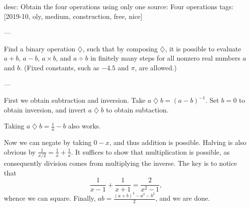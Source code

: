 desc: Obtain the four operations using only one
source: Four operations
tags: [2019-10, oly, medium, construction, free, nice]

---

Find a binary operation $\mathbin\diamondsuit$, such that by composing $\mathbin\diamondsuit$, it is possible to evaluate $a+b$, $a-b$, $a\times b$, and $a\div b$ in finitely many steps for all nonzero real numbers $a$ and $b$. (Fixed constants, such as $-4.5$ and $\pi$, are allowed.)

---

First we obtain subtraction and inversion. Take $a\mathbin\diamondsuit b=(a-b)^{-1}$. Set $b=0$ to obtain inversion, and invert $a\mathbin\diamondsuit b$ to obtain subtaction.
\begin{remark}
    Taking $a\mathbin\diamondsuit b=\frac1a-b$ also works.
\end{remark}
Now we can negate by taking $0-x$, and thus addition is possible. Halving is also obvious by $\frac1{x/2}=\frac1x+\frac1x$. It suffices to show that multiplication is possible, as consequently division comes from multiplying the inverse. The key is to notice that\[\frac1{x-1}+\frac1{x+1}=\frac2{x^2-1},\]
whence we can square. Finally, $ab=\frac{(a+b)^2-a^2-b^2}2$, and we are done.
